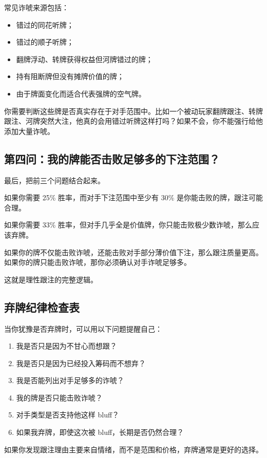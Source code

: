 常见诈唬来源包括：

\begin{itemize}
\item 错过的同花听牌；
\item 错过的顺子听牌；
\item 翻牌浮动、转牌获得权益但河牌错过的牌；
\item 持有阻断牌但没有摊牌价值的牌；
\item 由于牌面变化而适合代表强牌的空气牌。
\end{itemize}

你需要判断这些牌是否真实存在于对手范围中。比如一个被动玩家翻牌跟注、转牌跟注、河牌突然大注，他真的会用错过听牌这样打吗？如果不会，你不能强行给他添加大量诈唬。

\subsection{第四问：我的牌能否击败足够多的下注范围？}

最后，把前三个问题结合起来。

如果你需要 25\% 胜率，而对手下注范围中至少有 30\% 是你能击败的牌，跟注可能合理。

如果你需要 33\% 胜率，但对手几乎全是价值牌，你只能击败极少数诈唬，那么应该弃牌。

如果你的牌不仅能击败诈唬，还能击败对手部分薄价值下注，那么跟注质量更高。
如果你的牌只能击败诈唬，那你必须确认对手诈唬足够多。

这就是理性跟注的完整逻辑。

\subsection{弃牌纪律检查表}

当你犹豫是否弃牌时，可以用以下问题提醒自己：

\begin{enumerate}
\item 我是否只是因为不甘心而想跟？
\item 我是否只是因为已经投入筹码而不想弃？
\item 我是否能列出对手足够多的诈唬？
\item 我的牌是否只能击败诈唬？
\item 对手类型是否支持他这样 bluff？
\item 如果我弃牌，即使这次被 bluff，长期是否仍然合理？
\end{enumerate}

如果你发现跟注理由主要来自情绪，而不是范围和价格，弃牌通常是更好的选择。

